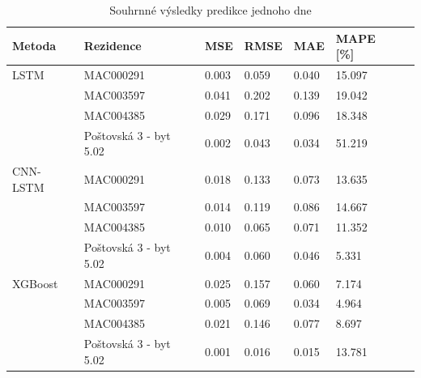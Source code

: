 \documentclass[FM,BP,fonts]{tulthesis}
\begin{document}
\begin{table}[!ht]
	\centering
	\caption{Souhrnné výsledky predikce jednoho dne}
	\def\arraystretch{1.2}
	\begin{tabular}{lllllll}
		\hline
		\textbf{Metoda} & \textbf{Rezidence} & \textbf{MSE} & \textbf{RMSE} & \textbf{MAE} & \textbf{MAPE [\%]} \\      \hline
		LSTM            & MAC000291          & 0.003          & 0.059          & 0.040           & 15.097              \\ 
		~               & MAC003597          & 0.041            & 0.202             & 0.139            & 19.042             \\  
		~               & MAC004385          & 0.029            & 0.171             &  0.096           & 18.348            \\ 
		~               & Poštovská 3 - byt 5.02              & 0.002            & 0.043             & 0.034           & 51.219 \\         
		
		\hline
		
		CNN-LSTM        & MAC000291          & 0.018               & 0.133               & 0.073           & 13.635              \\ 
		~               & MAC003597          & 0.014            & 0.119             & 0.086            & 14.667             \\  
		~               & MAC004385          & 0.010            & 0.065             & 0.071           & 11.352            \\ 
		~               & Poštovská 3 - byt 5.02              & 0.004            & 0.060             & 0.046           & 5.331 \\         
		
		\hline
		
		
		XGBoost         & MAC000291          & 0.025	       & 0.157             &  0.060        &  7.174            \\ 
		~               & MAC003597          & 0.005            & 0.069             & 0.034            & 4.964             \\  
		~               & MAC004385          & 0.021            & 0.146             &  0.077            &  8.697             \\ 
		~               & Poštovská 3 - byt 5.02  & 0.001           & 0.016             & 0.015            & 13.781\\   
		
		\hline
		

\end{tabular}
\end{table}
\end{document}

